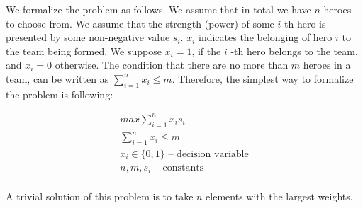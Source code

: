 \documentclass[smallextended]{svjour3}       %
\begin{document}
We formalize the problem as follows. We assume that in total we have $n$ heroes to choose from. We assume that the strength (power) of some $i$-th hero is presented by some non-negative value $s_i$. $x_i$ indicates the belonging of hero $i$ to the team being formed. We suppose $ x_i = 1 $, if the $ i $ -th hero belongs to the team, and $ x_i = 0 $ otherwise.  The condition that there are no more than $m$ heroes in a team, can be written as $ \sum_{i=1}^n x_i \leq m $.
Therefore, the simplest way to formalize the problem is following:

\begin{equation}
\begin{gathered}
    max \sum_{i=1}^n x_i s_i \\
    \sum_{i=1}^n x_i \leq m \\
    x_i \in \{0, 1\} \text{ – decision variable} \\
   n, m, s_i \text{ – constants}  \\
\end{gathered}
\end{equation}

A trivial solution of this problem is to take $ n $ elements with the largest weights.
\end{document}
